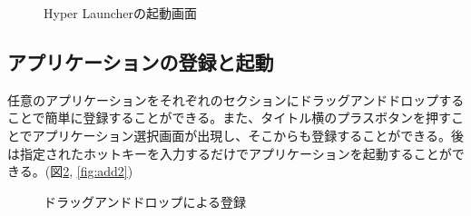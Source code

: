 \begin{figure}[h]
    \begin{center}
    \end{center}
    \caption{Hyper Launcherの起動画面}
    \label{fig:hyper-launcher}
\end{figure}

\subsection{アプリケーションの登録と起動}

任意のアプリケーションをそれぞれのセクションにドラッグアンドドロップすることで簡単に登録することができる。また、タイトル横のプラスボタンを押すことでアプリケーション選択画面が出現し、そこからも登録することができる。後は指定されたホットキーを入力するだけでアプリケーションを起動することができる。(図\ref{fig:add1}, \ref{fig:add2})

\begin{figure}[h]
    \begin{center}
    \end{center}
    \caption{ドラッグアンドドロップによる登録}
    \label{fig:add1}
\end{figure}

